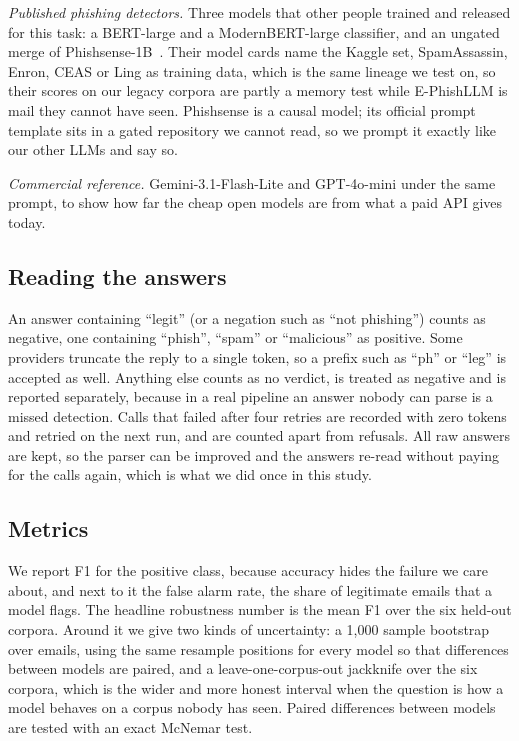 \textit{Published phishing detectors.} Three models that other people trained
and released for this task: a BERT-large and a ModernBERT-large classifier, and
an ungated merge of Phishsense-1B~\cite{phishsense}. Their model cards name the
Kaggle set, SpamAssassin, Enron, CEAS or Ling as training data, which is the
same lineage we test on, so their scores on our legacy corpora are partly a
memory test while E-PhishLLM is mail they cannot have seen. Phishsense is a
causal model; its official prompt template sits in a gated repository we cannot
read, so we prompt it exactly like our other LLMs and say so.

\textit{Commercial reference.} Gemini-3.1-Flash-Lite and GPT-4o-mini under the
same prompt, to show how far the cheap open models are from what a paid API
gives today.

\subsection{Reading the answers}

An answer containing ``legit'' (or a negation such as ``not phishing'') counts
as negative, one containing ``phish'', ``spam'' or ``malicious'' as positive.
Some providers truncate the reply to a single token, so a prefix such as
``ph'' or ``leg'' is accepted as well. Anything else counts as no verdict, is
treated as negative and is reported separately, because in a real pipeline an
answer nobody can parse is a missed detection. Calls that failed after four
retries are recorded with zero tokens and retried on the next run, and are
counted apart from refusals. All raw answers are kept, so the parser can be
improved and the answers re-read without paying for the calls again, which is
what we did once in this study.

\subsection{Metrics}

We report F1 for the positive class, because accuracy hides the failure we
care about, and next to it the false alarm rate, the share of legitimate
emails that a model flags. The headline robustness number is the mean F1 over
the six held-out corpora. Around it we give two kinds of uncertainty: a 1{,}000
sample bootstrap over emails, using the same resample positions for every model
so that differences between models are paired, and a leave-one-corpus-out
jackknife over the six corpora, which is the wider and more honest interval
when the question is how a model behaves on a corpus nobody has seen. Paired
differences between models are tested with an exact McNemar test.

